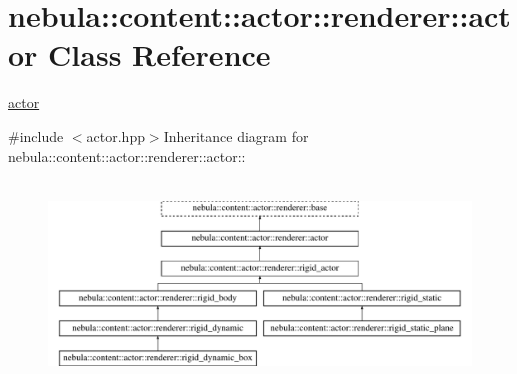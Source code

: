 \hypertarget{classnebula_1_1content_1_1actor_1_1renderer_1_1actor}{
\section{nebula::content::actor::renderer::actor Class Reference}
\label{classnebula_1_1content_1_1actor_1_1renderer_1_1actor}
}


\hyperlink{classnebula_1_1content_1_1actor_1_1renderer_1_1actor}{actor}  


{\ttfamily \#include $<$actor.hpp$>$}Inheritance diagram for nebula::content::actor::renderer::actor::\begin{figure}[H]
\begin{center}
\leavevmode
\includegraphics[height=5.45455cm]{classnebula_1_1content_1_1actor_1_1renderer_1_1actor}
\end{center}
\end{figure}
